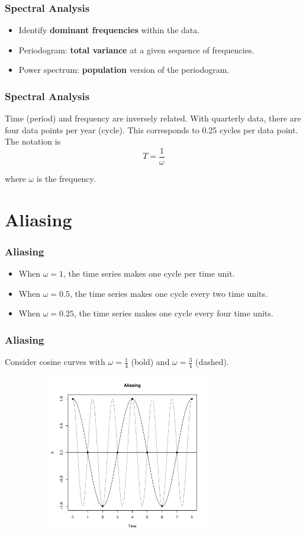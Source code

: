 \documentclass[%
xcolor=pdftex]{beamer}
\begin{document}
\begin{frame}
\frametitle{Spectral Analysis}

\begin{itemize}
\item Identify \textbf{dominant frequencies} within the data.
\item Periodogram: \textbf{total variance} at a given sequence of frequencies.
\item Power spectrum: \textbf{population} version of the periodogram.
\end{itemize}


\end{frame}


\begin{frame}
\frametitle{Spectral Analysis}

Time (period) and frequency are inversely related.  With quarterly data, there are four data points per year (cycle).  This corresponds to 0.25 cycles per data point.  The notation is
$$
T=\frac{1}{\omega}
$$

where $\omega$ is the frequency.

\end{frame}

\section{Aliasing}
\frame{\tableofcontents[currentsection]}

\begin{frame}
\frametitle{Aliasing}

\begin{itemize}
\item When $\omega=1$, the time series makes one cycle per time unit.
\item When $\omega=0.5$, the time series makes one cycle every two time units.
\item When $\omega=0.25$, the time series makes one cycle every four time units.
\end{itemize}

\end{frame}

\begin{frame}
\frametitle{Aliasing}

Consider cosine curves with $\omega=\frac{1}{4}$ (bold) and $\omega=\frac{3}{4}$ (dashed).

\includegraphics[width=110mm, height=70mm]{alias.pdf}

\end{frame}
\end{document}
